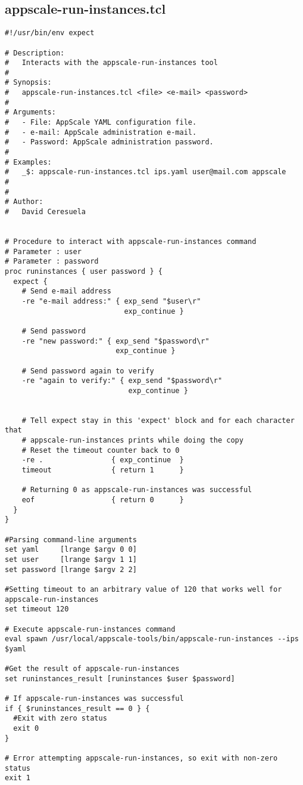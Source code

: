 \subsection{appscale-run-instances.tcl}


\begin{lstlisting}
#!/usr/bin/env expect

# Description:
#   Interacts with the appscale-run-instances tool
#
# Synopsis:
#   appscale-run-instances.tcl <file> <e-mail> <password>
#
# Arguments:
#   - File: AppScale YAML configuration file.
#   - e-mail: AppScale administration e-mail.
#   - Password: AppScale administration password.
#
# Examples:
#   _$: appscale-run-instances.tcl ips.yaml user@mail.com appscale
#
#
# Author:
#   David Ceresuela


# Procedure to interact with appscale-run-instances command
# Parameter : user
# Parameter : password 
proc runinstances { user password } {
  expect {
    # Send e-mail address
    -re "e-mail address:" { exp_send "$user\r"
                            exp_continue }

    # Send password
    -re "new password:" { exp_send "$password\r"
                          exp_continue }
    
    # Send password again to verify
    -re "again to verify:" { exp_send "$password\r"
                             exp_continue }
    
            
    # Tell expect stay in this 'expect' block and for each character that
    # appscale-run-instances prints while doing the copy
    # Reset the timeout counter back to 0
    -re .                { exp_continue  }
    timeout              { return 1      }
    
    # Returning 0 as appscale-run-instances was successful
    eof                  { return 0      }
  }
}

#Parsing command-line arguments
set yaml     [lrange $argv 0 0]
set user     [lrange $argv 1 1]
set password [lrange $argv 2 2]

#Setting timeout to an arbitrary value of 120 that works well for appscale-run-instances
set timeout 120

# Execute appscale-run-instances command
eval spawn /usr/local/appscale-tools/bin/appscale-run-instances --ips $yaml

#Get the result of appscale-run-instances
set runinstances_result [runinstances $user $password]

# If appscale-run-instances was successful
if { $runinstances_result == 0 } {
  #Exit with zero status
  exit 0
}

# Error attempting appscale-run-instances, so exit with non-zero status
exit 1
\end{lstlisting}


